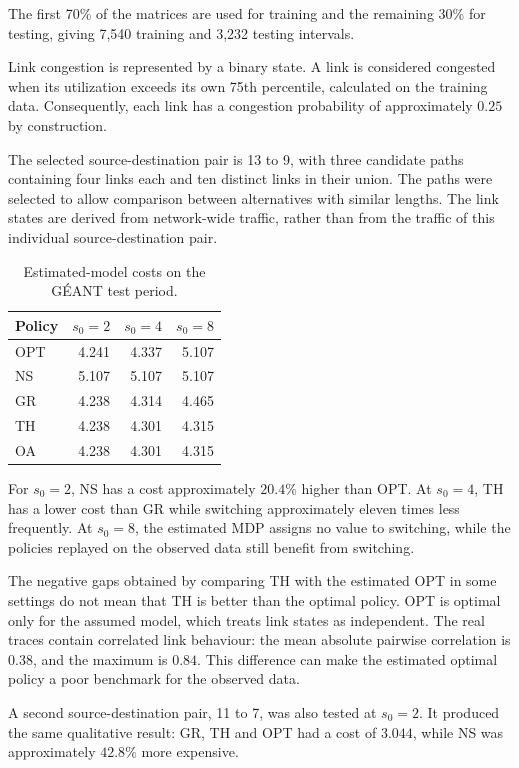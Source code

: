 \documentclass{amsart}
\begin{document}
The first 70\% of the matrices are used for training and the
remaining 30\% for testing, giving 7,540 training and 3,232
testing intervals.

Link congestion is represented by a binary state. A link is
considered congested when its utilization exceeds its own
75th percentile, calculated on the training data. Consequently,
each link has a congestion probability of approximately $0.25$
by construction.

The selected source-destination pair is 13 to 9, with three
candidate paths containing four links each and ten distinct links
in their union. The paths were selected to allow comparison
between alternatives with similar lengths. The link states are
derived from network-wide traffic, rather than from the traffic
of this individual source-destination pair.

\begin{table}[ht]
\centering
\begin{tabular}{lrrr}
\hline
Policy & $s_0=2$ & $s_0=4$ & $s_0=8$ \\
\hline
OPT & 4.241 & 4.337 & 5.107 \\
NS  & 5.107 & 5.107 & 5.107 \\
GR  & 4.238 & 4.314 & 4.465 \\
TH  & 4.238 & 4.301 & 4.315 \\
OA  & 4.238 & 4.301 & 4.315 \\
\hline
\end{tabular}
\caption{Estimated-model costs on the GÉANT test period.}
\label{tab:geant}
\end{table}

For $s_0=2$, NS has a cost approximately $20.4\%$ higher than
OPT. At $s_0=4$, TH has a lower cost than GR while switching
approximately eleven times less frequently. At $s_0=8$, the
estimated MDP assigns no value to switching, while the policies
replayed on the observed data still benefit from switching.

The negative gaps obtained by comparing TH with the estimated
OPT in some settings do not mean that TH is better than the
optimal policy. OPT is optimal only for the assumed model, which
treats link states as independent. The real traces contain
correlated link behaviour: the mean absolute pairwise correlation
is $0.38$, and the maximum is $0.84$. This difference can make
the estimated optimal policy a poor benchmark for the observed
data.

A second source-destination pair, 11 to 7, was also tested at
$s_0=2$. It produced the same qualitative result: GR, TH and
OPT had a cost of $3.044$, while NS was approximately $42.8\%$
more expensive.
\end{document}
